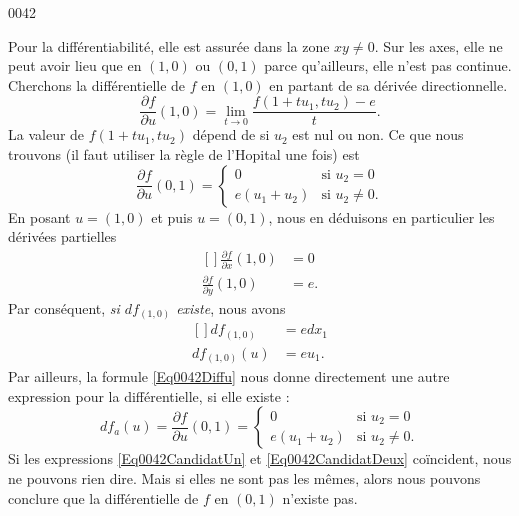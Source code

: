 \begin{corrige}{0042}
\begin{alternative}
\begin{enumerate}
Pour la différentiabilité, elle est assurée dans la zone $xy\neq 0$. Sur les axes, elle ne peut avoir lieu que en $(1,0)$ ou $(0,1)$ parce qu'ailleurs, elle n'est pas continue. Cherchons la différentielle de $f$ en $(1,0)$ en partant de sa dérivée directionnelle.
\begin{equation}
	\frac{ \partial f }{ \partial u }(1,0)=\lim_{t\to 0}\frac{ f(1+tu_1,tu_2)-e }{ t }.
\end{equation}
La valeur de $f(1+tu_1,tu_2)$ dépend de si $u_2$ est nul ou non. Ce que nous trouvons (il faut utiliser la règle de l'Hopital une fois) est
\begin{equation}		\label{Eq0042Diffu}
	\frac{ \partial f }{ \partial u }(0,1)=
\begin{cases}
	0	&	\text{si $u_2=0$}\\
	e(u_1+u_2)	&	 \text{si $u_2\neq 0$}.
\end{cases}
\end{equation}
En posant $u=(1,0)$ et puis $u=(0,1)$, nous en déduisons en particulier les dérivées partielles
\begin{equation}
	\begin{aligned}[]
		\frac{ \partial f }{ \partial x }(1,0)	&=0\\
		\frac{ \partial f }{ \partial y }(1,0)	&=e.
	\end{aligned}
\end{equation}
Par conséquent, \emph{si $df_{(1,0)}$ existe}, nous avons
\begin{equation}		\label{Eq0042CandidatUn}
	\begin{aligned}[]
		df_{(1,0)}	&=edx_1\\
		df_{(1,0)}(u)	&=eu_1.
	\end{aligned}
\end{equation}
Par ailleurs, la formule \eqref{Eq0042Diffu} nous donne directement une autre expression pour la différentielle, si elle existe :
\begin{equation}		\label{Eq0042CandidatDeux}
	df_a(u)=\frac{ \partial f }{ \partial u }(0,1)=
\begin{cases}
	0	&	\text{si $u_2=0$}\\
	e(u_1+u_2)	&	 \text{si $u_2\neq 0$}.
\end{cases}
\end{equation}
Si les expressions \eqref{Eq0042CandidatUn} et \eqref{Eq0042CandidatDeux} coïncident, nous ne pouvons rien dire. Mais si elles ne sont pas les mêmes, alors nous pouvons conclure que la différentielle de $f$ en $(0,1)$ n'existe pas.


\end{enumerate}
\end{alternative}
\end{corrige}
